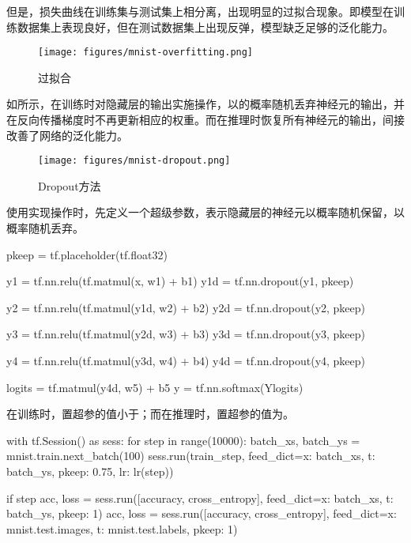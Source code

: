 \begin{content}
但是，损失曲线在训练集与测试集上相分离，出现明显的过拟合现象。即模型在训练数据集上表现良好，但在测试数据集上出现反弹，模型缺乏足够的泛化能力。

\begin{figure}[H]
\centering
\texttt{[image: figures/mnist-overfitting.png]}
\caption{过拟合}
 \label{fig:mnist-overfitting}
\end{figure}

如所示，在训练时对隐藏层的输出实施操作，以的概率随机丢弃神经元的输出，并在反向传播梯度时不再更新相应的权重。而在推理时恢复所有神经元的输出，间接改善了网络的泛化能力。

\begin{figure}[H]
\centering
\texttt{[image: figures/mnist-dropout.png]}
\caption{Dropout方法}
 \label{fig:mnist-dropout}
\end{figure}

使用\tf{}实现操作时，先定义一个超级参数，表示隐藏层的神经元以概率随机保留，以概率随机丢弃。

\begin{leftbar}
\begin{python}
pkeep = tf.placeholder(tf.float32)

y1 = tf.nn.relu(tf.matmul(x,  w1) + b1)
y1d = tf.nn.dropout(y1, pkeep)

y2 = tf.nn.relu(tf.matmul(y1d, w2) + b2)
y2d = tf.nn.dropout(y2, pkeep)

y3 = tf.nn.relu(tf.matmul(y2d, w3) + b3)
y3d = tf.nn.dropout(y3, pkeep)

y4 = tf.nn.relu(tf.matmul(y3d, w4) + b4)
y4d = tf.nn.dropout(y4, pkeep)

logits = tf.matmul(y4d, w5) + b5
y = tf.nn.softmax(Ylogits)
\end{python}
\end{leftbar}

在训练时，置超参的值小于；而在推理时，置超参的值为。

\begin{leftbar}
\begin{python}
with tf.Session() as sess:
  for step in range(10000):
    batch_xs, batch_ys = mnist.train.next_batch(100)
    sess.run(train_step, 
      feed_dict={x: batch_xs, t: batch_ys, pkeep: 0.75, lr: lr(step)})

    if step %
      acc, loss = sess.run([accuracy, cross_entropy], 
        feed_dict={x: batch_xs, t: batch_ys, pkeep: 1})
      acc, loss = sess.run([accuracy, cross_entropy], 
        feed_dict={x: mnist.test.images, t: mnist.test.labels, pkeep: 1})
\end{python}
\end{leftbar}


\end{content}
